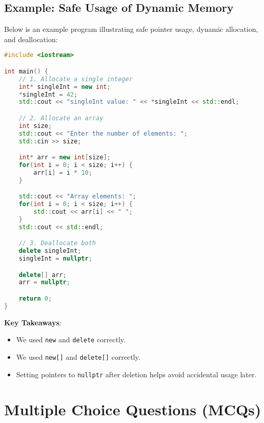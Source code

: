 \documentclass[a4paper,12pt]{article}
\begin{document}
\newpage
\subsection{Example: Safe Usage of Dynamic Memory}
Below is an example program illustrating safe pointer usage, dynamic allocation, and deallocation:

\begin{lstlisting}[language=C++]
#include <iostream>

int main() {
    // 1. Allocate a single integer
    int* singleInt = new int;
    *singleInt = 42;
    std::cout << "singleInt value: " << *singleInt << std::endl;

    // 2. Allocate an array
    int size;
    std::cout << "Enter the number of elements: ";
    std::cin >> size;

    int* arr = new int[size];
    for(int i = 0; i < size; i++) {
        arr[i] = i * 10;
    }

    std::cout << "Array elements: ";
    for(int i = 0; i < size; i++) {
        std::cout << arr[i] << " ";
    }
    std::cout << std::endl;

    // 3. Deallocate both
    delete singleInt;
    singleInt = nullptr;

    delete[] arr;
    arr = nullptr;

    return 0;
}
\end{lstlisting}

\noindent
\textbf{Key Takeaways}:
\begin{itemize}
    \item We used \texttt{new} and \texttt{delete} correctly.
    \item We used \texttt{new[]} and \texttt{delete[]} correctly.
    \item Setting pointers to \texttt{nullptr} after deletion helps avoid accidental usage later.
\end{itemize}


\section{Multiple Choice Questions (MCQs)}
\end{document}
